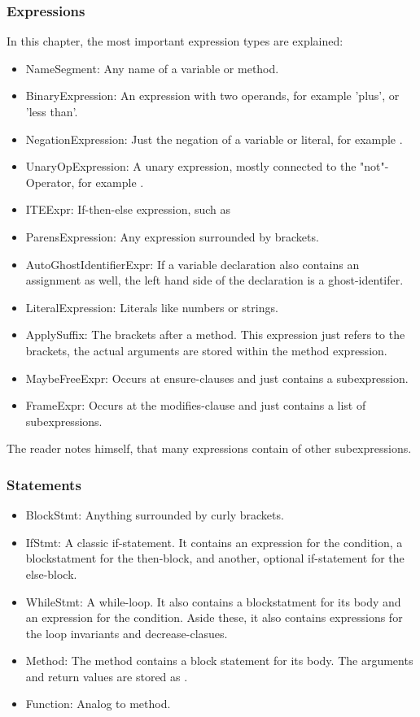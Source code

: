 \subsubsection{Expressions}
In this chapter, the most important expression types are explained:
\begin{itemize}

    \item NameSegment: Any name of a variable or method.
    \item BinaryExpression: An expression with two operands, for example 'plus', or 'less than'.
    \item NegationExpression: Just the negation of a variable or literal, for example .
    \item UnaryOpExpression: A unary expression, mostly connected to the "not"-Operator, for example .
    \item ITEExpr: If-then-else expression, such as 
    \item ParensExpression: Any expression surrounded by brackets.
    \item AutoGhostIdentifierExpr: If a variable declaration also contains an assignment as well, the left hand side of the declaration is a ghost-identifer.
    \item LiteralExpression: Literals like numbers or strings.
    \item ApplySuffix: The brackets after a method. This expression just refers to the brackets, the actual arguments are stored within the method expression.
    \item MaybeFreeExpr: Occurs at ensure-clauses and just contains a subexpression.
    \item FrameExpr: Occurs at the modifies-clause and just contains a list of subexpressions.
\end{itemize}
The reader notes himself, that many expressions contain of other subexpressions.

\subsubsection{Statements}
\begin{itemize}
    \item BlockStmt: Anything surrounded by curly brackets.
    \item IfStmt: A classic if-statement. It contains an expression for the condition, a blockstatment for the then-block, and another, optional if-statement for the else-block.
    \item WhileStmt: A while-loop. It also contains a blockstatment for its body and an expression for the condition. Aside these, it also contains expressions for the loop invariants and decrease-clasues.
    \item Method: The method contains a block statement for its body. The arguments and return values are stored as .
    \item Function: Analog to method.
\end{itemize}

